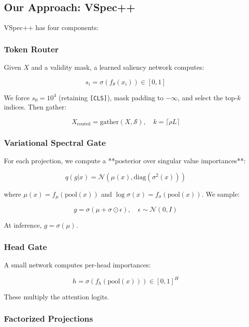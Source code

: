 \subsection{Our Approach: VSpec++}

VSpec++ has four components:

\subsubsection{Token Router}

Given $X$ and a validity mask, a learned saliency network computes:

\[
s_i = \sigma(f_\theta(x_i)) \in [0, 1]
\tag{1.1}
\]

We force $s_0 = 10^4$ (retaining \texttt{[CLS]}), mask padding to $-\infty$, and 
select the top-$k$ indices. Then gather:

\[
X_\text{routed} = \text{gather}(X, \mathcal{S}), \quad k = \lceil \rho L \rceil
\tag{1.2}
\]

\subsubsection{Variational Spectral Gate}

For each projection, we compute a **posterior over singular value 
importances**:

\[
q(g | x) = \mathcal{N}\!\left(\mu(x), \text{diag}(\sigma^2(x))\right)
\tag{1.3}
\]

where $\mu(x) = f_\mu(\text{pool}(x))$ and $\log \sigma(x) = f_\sigma(\text{pool}(x))$. 
We sample:

\[
g = \sigma(\mu + \sigma \odot \epsilon), \quad \epsilon \sim \mathcal{N}(0, I)
\tag{1.4}
\]

At inference, $g = \sigma(\mu)$.

\subsubsection{Head Gate}

A small network computes per-head importances:

\[
h = \sigma(f_h(\text{pool}(x))) \in [0, 1]^H
\tag{1.5}
\]

These multiply the attention logits.

\subsubsection{Factorized Projections}

